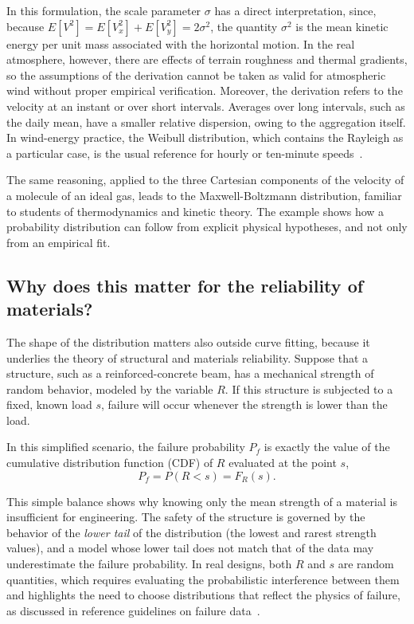 In this formulation, the scale parameter $\sigma$ has a direct interpretation, since, because $E[V^2] = E[V_x^2] + E[V_y^2] = 2\sigma^2$, the quantity $\sigma^2$ is the mean kinetic energy per unit mass associated with the horizontal motion. In the real atmosphere, however, there are effects of terrain roughness and thermal gradients, so the assumptions of the derivation cannot be taken as valid for atmospheric wind without proper empirical verification. Moreover, the derivation refers to the velocity at an instant or over short intervals. Averages over long intervals, such as the daily mean, have a smaller relative dispersion, owing to the aggregation itself. In wind-energy practice, the Weibull distribution, which contains the Rayleigh as a particular case, is the usual reference for hourly or ten-minute speeds~\cite{justus1978,carta2009}.

The same reasoning, applied to the three Cartesian components of the velocity of a molecule of an ideal gas, leads to the Maxwell-Boltzmann distribution, familiar to students of thermodynamics and kinetic theory. The example shows how a probability distribution can follow from explicit physical hypotheses, and not only from an empirical fit.

\subsection{Why does this matter for the reliability of materials?}

The shape of the distribution matters also outside curve fitting, because it underlies the theory of structural and materials reliability. Suppose that a structure, such as a reinforced-concrete beam, has a mechanical strength of random behavior, modeled by the variable $R$. If this structure is subjected to a fixed, known load $s$, failure will occur whenever the strength is lower than the load.

In this simplified scenario, the failure probability $P_f$ is exactly the value of the cumulative distribution function (CDF) of $R$ evaluated at the point $s$,
\begin{equation}
    P_f = P(R < s) = F_R(s).
\end{equation}

This simple balance shows why knowing only the mean strength of a material is insufficient for engineering. The safety of the structure is governed by the behavior of the \textit{lower tail} of the distribution (the lowest and rarest strength values), and a model whose lower tail does not match that of the data may underestimate the failure probability. In real designs, both $R$ and $s$ are random quantities, which requires evaluating the probabilistic interference between them and highlights the need to choose distributions that reflect the physics of failure, as discussed in reference guidelines on failure data~\cite{nist2012}.

